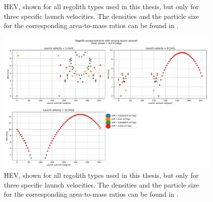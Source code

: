 \documentclass[print]{tudelft-report}
\begin{document}
\begin{appendices}
\begin{figure}[htb]
    \caption{\gls{HEV}, shown for all regolith types used in this thesis, but only for three specific launch velocities. The densities and the particle size for the corresponding area-to-mass ratios can be found in .}
    \label{fig:longestEdge_allParticles_escape_hev_solarPhase225}
    \end{figure}
    \FloatBarrier
    \begin{figure}[htb]
    \centering
    \captionsetup{justification=centering}
    \includegraphics[width=\textwidth, height=0.5\textheight, keepaspectratio=true]{Results/Images/longest_edge_perturbations/multiple_regolith_types/phase315_escapeHEV.pdf}
    \caption{\gls{HEV}, shown for all regolith types used in this thesis, but only for three specific launch velocities. The densities and the particle size for the corresponding area-to-mass ratios can be found in .}
    \label{fig:longestEdge_allParticles_escape_hev_solarPhase315}
    \end{figure}
    \FloatBarrier
    \begin{figure}[htb]
    \centering
    \captionsetup{justification=centering}

\end{figure}
\end{appendices}
\end{document}
